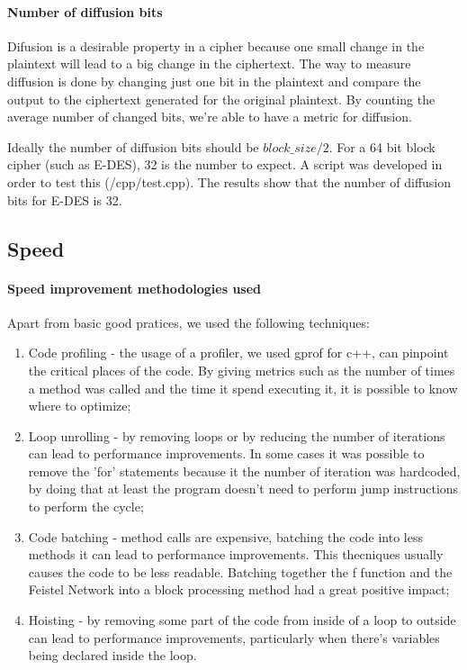 \documentclass{article} %
\begin{document}
\paragraph{Number of diffusion bits}
Difusion is a desirable property in a cipher because one small change in the plaintext will lead to a big change in the ciphertext. 
The way to measure diffusion is done by changing just one bit in the plaintext and compare the output to the ciphertext generated for the original plaintext. By counting the average number
of changed bits, we're able to have a metric for diffusion. 

Ideally the number of diffusion bits should be $block\_size/2$. For a 64 bit block cipher (such as E-DES), 32 is the number to expect. A script was developed in order
to test this (/cpp/test.cpp). The results show that the number of diffusion bits for E-DES is 32.


\subsection{Speed}
\label{speedinp}
\paragraph{Speed improvement methodologies used}

Apart from basic good pratices, we used the following techniques:
\begin{enumerate}
  \item Code profiling - the usage of a profiler, we used gprof for c++, can pinpoint the critical places of the code. By giving metrics such as the number of 
  times a method was called and the time it spend executing it, it is possible to know where to optimize;
  \item Loop unrolling - by removing loops or by reducing the number of iterations can lead to performance improvements. In some cases it was possible to remove the 'for'
  statements because it the number of iteration was hardcoded, by doing that at least the program doesn't need to perform jump instructions to perform the cycle;
  \item Code batching - method calls are expensive, batching the code into less methods it can lead to performance improvements. This thecniques usually causes the code 
  to be less readable. Batching together the f function and the Feistel Network into a block processing method had a great positive impact;
  \item Hoisting - by removing some part of the code from inside of a loop to outside can lead to performance improvements, particularly when there's variables being
  declared inside the loop.
\end{enumerate}
\end{document}

